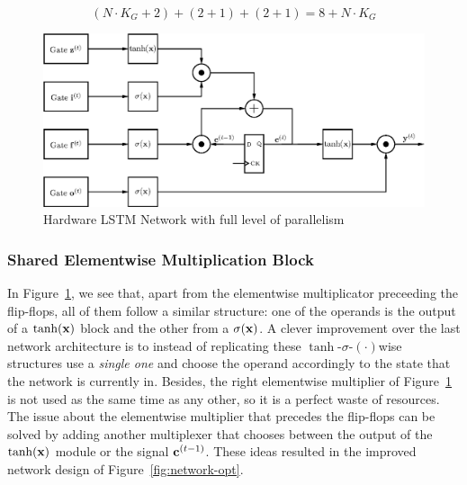 \begin{equation}\label{eq:numcc_network}
    (N \cdot K_G + 2) + (2 + 1) + (2 + 1) = 8 + N\cdot K_G
\end{equation}

\begin{figure}
    \centering
    \includegraphics[width=0.9\linewidth]{figures/network.eps}
    \caption[Hardware LSTM Network with full level of parallelism]{Hardware LSTM Network with full level of parallelism}
    \label{fig:network}
\end{figure}

\subsubsection{Shared Elementwise Multiplication Block}\label{sec:struct-fullpar}
In Figure~\ref{fig:network}, we see that, apart from the elementwise multiplicator preceeding the flip-flops, all of them follow a similar structure: one of the operands is the output of a $\tanh(\mathbf{x})$ block and the other from a $\sigma(\mathbf{x})$. A clever improvement over the last network architecture is to instead of replicating these $\tanh$-$\sigma$-$(\cdot)$wise structures use a \emph{single one} and choose the operand accordingly to the state that the network is currently in. Besides, the right elementwise multiplier of Figure~\ref{fig:network} is not used as the same time as any other, so it is a perfect waste of resources. The issue about the elementwise multiplier that precedes the flip-flops can be solved by adding another multiplexer that chooses between the output of the $\tanh(\mathbf{x})$ module or the signal $\mathbf{c}^{(t-1)}$. These ideas resulted in the improved network design of Figure~\ref{fig:network-opt}.

